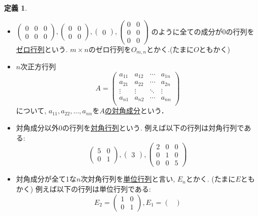 \documentclass[dvipdfmx,a4paper,11pt]{article} %
\theoremstyle{definition}
\newtheorem{dfn}[thm]{定義}
\begin{document}
 \begin{dfn}

\begin{itemize}
\item  $
 \begin{pmatrix}
0 &0&0\\
0 &0&0
 \end{pmatrix}, 
  \begin{pmatrix}
0 &0\\
0 &0
 \end{pmatrix}, 
   \begin{pmatrix}
0 
 \end{pmatrix}, 
   \begin{pmatrix}
0 &0\\
0 &0 \\
0&0
 \end{pmatrix}
 $
 のように全ての成分が0の行列を\underline{ゼロ行列}という.
 $m\times n$のゼロ行列を$O_{m, n}$とかく.(たまに$O$ともかく)
 \item $n$次正方行列
 $$
 A =
 \begin{pmatrix}
a_{11}& a_{12} & \cdots &a_{1n} \\
a_{21}& a_{22} & \cdots &a_{2n} \\
\vdots& \vdots	&	\ddots   &	\vdots \\
a_{n1}& a_{n2} & \cdots &a_{nn} \\
\end{pmatrix}
 $$
 について, $a_{11}, a_{22}, \ldots, a_{nn}$を\underline{$A$の対角成分}という．
 \item 対角成分以外0の行列を\underline{対角行列}という. 例えば以下の行列は対角行列である:
  $$
 \begin{pmatrix}
5&0\\
0 &1
 \end{pmatrix}, 
  \begin{pmatrix}
3
 \end{pmatrix}, 
   \begin{pmatrix}
2&0 &0\\
0 &1 &0\\
0&0&5
 \end{pmatrix}
 $$
 \item 対角成分が全て1な$n$次対角行列を\underline{単位行列}と言い, $E_n$とかく. (たまに$E$ともかく)
 例えば以下の行列は単位行列である:
   $$
   E_2 =
 \begin{pmatrix}
1&0\\
0 &1
 \end{pmatrix}, 
 E_1=
  \begin{pmatrix}

\end{pmatrix}$$
\end{itemize}
\end{dfn}
\end{document}
